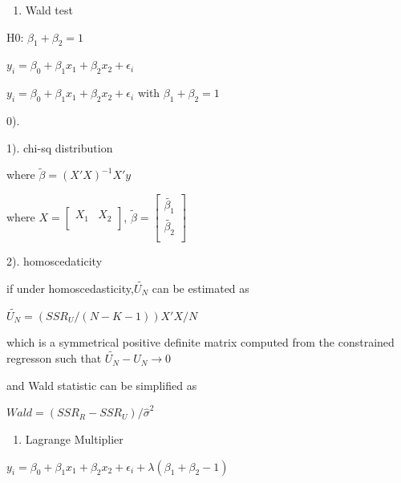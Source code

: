\documentclass[]{article}
\providecommand{\tightlist}{%
  \setlength{\itemsep}{0pt}\setlength{\parskip}{0pt}}
\begin{document}
\begin{enumerate}
\def\labelenumi{\arabic{enumi}.}
\tightlist
\item
  Wald test
\end{enumerate}

\centerline{H0: $\beta_1 + \beta_2 =1$}

\centerline{$y_{i}=\beta_{0}+\beta_{1}x_{1}+\beta_{2}x_{2}+\epsilon_{i}$}\centerline{$y_{i}=\beta_{0}+\beta_{1}x_{1}+\beta_{2}x_{2}+\epsilon_{i}$ with $\beta_{1}+\beta_{2}=1$}

0).


1). chi-sq distribution

where \(\tilde{\beta}=(X'X)^{-1}X'y\)

where \(X=\begin{bmatrix} X_1 & X_2 \\ \end{bmatrix}\),
\(\tilde{\beta}=\begin{bmatrix} \tilde{\beta_1} \\ \tilde{\beta_2} \\ \end{bmatrix}\)

2). homoscedaticity

if under homoscedasticity,\(\tilde{U_N}\) can be estimated as

\centerline{$\tilde{U_N}=(SSR_U/(N-K-1))X'X/N$}

which is a symmetrical positive definite matrix computed from the
constrained regresson such that \(\tilde{U_N}-U_N\longrightarrow 0\)

and Wald statistic can be simplified as

\centerline{$Wald=(SSR_R-SSR_U)/\hat\sigma^2$}

\begin{enumerate}
\def\labelenumi{\arabic{enumi}.}
\setcounter{enumi}{1}
\tightlist
\item
  Lagrange Multiplier
\end{enumerate}

\centerline{$y_{i}=\beta_{0}+\beta_{1}x_{1}+\beta_{2}x_{2}+\epsilon_{i}+\lambda(\beta_1+\beta_2-1)$}
\end{document}
